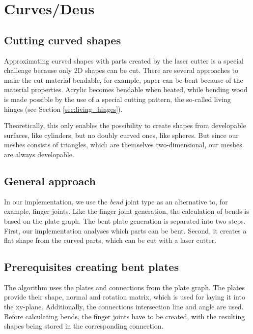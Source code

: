 \documentclass[../ClassicThesis.tex]{subfiles}
\begin{document}
\chapter{Curves/Deus}\label{ch:curves}

\section{Cutting curved shapes}

Approximating curved shapes with parts created by the laser cutter is a special challenge because only 2D shapes can be cut. There are several approaches to make the cut material bendable, for example, paper can be bent because of the material properties. Acrylic becomes bendable when heated, while bending wood is made possible by the use of a special cutting pattern, the so-called living hinges (see Section \ref{sec:living_hinges}).

Theoretically, this only enables the possibility to create shapes from developable surfaces, like cylinders, but no doubly curved ones, like spheres. But since our meshes consists of triangles, which are themselves two-dimensional, our meshes are always developable.

\section{General approach}

In our implementation, we use the  \emph{bend} joint type as an alternative to, for example, finger joints. Like the finger joint generation, the calculation of bends is based on the plate graph. The bent plate generation is separated into two steps. First, our implementation analyses which parts can be bent. Second, it creates a flat shape from the curved parts, which can be cut with a laser cutter. 

\section{Prerequisites creating bent plates}

The algorithm uses the plates and connections from the plate graph. The plates provide their shape, normal and rotation matrix, which is used for laying it into the xy-plane. Additionally, the connections intersection line and angle are used. Before calculating bends, the finger joints have to be created, with the resulting shapes being stored in the corresponding connection.
\end{document}
